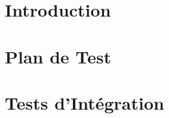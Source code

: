 \documentclass[asi,sansVersion]{picInsa}
\title{\PTI{}}
\author{\Julie} %
\begin{document}
\couverture{}

 \informationsGenerales{}


\tableofcontents

\setcounter{chapter}{0}

\chapter{Introduction}
\label{introduction}


\chapter{Plan de Test}
\label{planDeTest}


\chapter{Tests d'Intégration}
\label{testsDIntegration}



\pageQuatriemeCouverture
\end{document}
